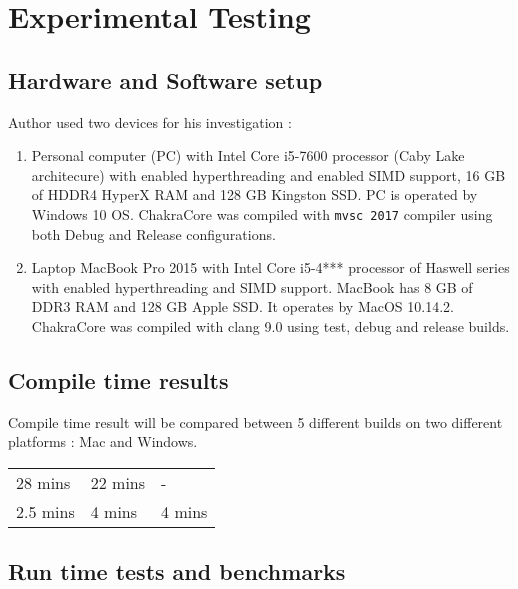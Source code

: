 \chapter{Experimental Testing}

\section{Hardware and Software setup}

Author used two devices for his investigation :
\begin{enumerate}
 \item Personal computer (PC) with Intel Core i5-7600 processor (Caby Lake architecure) with enabled hyperthreading and enabled SIMD support, 16 GB of HDDR4 HyperX RAM and 128 GB Kingston SSD.
  PC is operated by Windows 10 OS. ChakraCore was compiled with \texttt{mvsc 2017} compiler using both Debug and Release configurations.

\item Laptop MacBook Pro 2015 with Intel Core i5-4*** processor of Haswell series with enabled hyperthreading and SIMD support.
  MacBook has 8 GB of DDR3 RAM and 128 GB Apple SSD.
  It operates by MacOS 10.14.2. ChakraCore was compiled with clang 9.0 using test, debug and release builds.
\end{enumerate}

\section{Compile time results}

Compile time result will be compared between 5 different builds on two different platforms : Mac and Windows.

\begin{table}[]
\begin{tabular}{lll}
28 mins  & 22 mins & -      \\
2.5 mins & 4 mins  & 4 mins
\end{tabular}
\end{table}

\section{Run time tests and benchmarks}